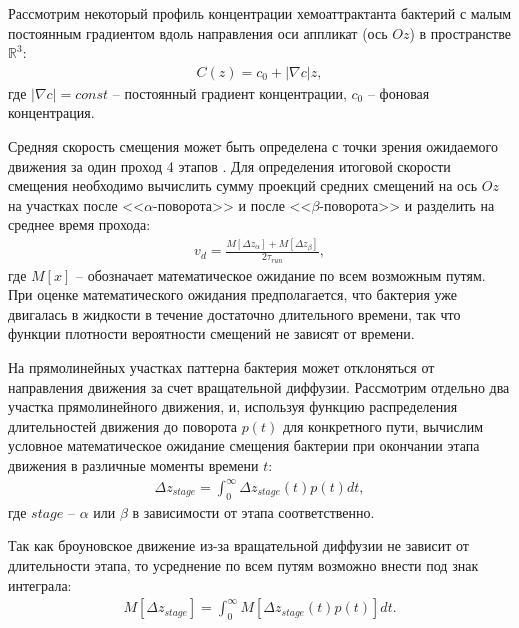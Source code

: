 Рассмотрим некоторый профиль концентрации хемоаттрактанта бактерий с малым постоянным градиентом вдоль направления оси аппликат (ось $Oz$) в пространстве $\mathbb{R}^3$:
\begin{equation}
    \begin{aligned}
        C(z) = c_0 + |\nabla c| z,
    \label{eq:linear-concentration}
    \end{aligned}
\end{equation}
где $|\nabla c|=const$ -- постоянный градиент концентрации, $c_0$ -- фоновая концентрация.

Средняя скорость смещения может быть определена с точки зрения ожидаемого движения за один проход 4 этапов \cite{locsei_persistence_2007}. Для определения итоговой скорости смещения необходимо вычислить сумму проекций средних смещений на ось $Oz$ на участках после <<$\alpha$-поворота>> и после <<$\beta$-поворота>> и разделить на среднее время прохода:
\begin{equation}
    \begin{aligned}
        v_d=\frac{M\left [\Delta z_{\alpha} \right ] + M\left [\Delta z_{\beta} \right ]}{{2\tau_{run}}},
    \label{eq:drift-speed-alpha-beta}
    \end{aligned}
\end{equation}
где $M\left [x \right ]$ -- обозначает математическое ожидание по всем возможным путям. При оценке математического ожидания предполагается, что бактерия уже двигалась в жидкости в течение достаточно длительного времени, так что функции плотности вероятности смещений не зависят от времени. 

На прямолинейных участках паттерна бактерия может отклоняться от направления движения за счет вращательной диффузии. Рассмотрим отдельно два участка прямолинейного движения, и, используя функцию распределения длительностей движения до поворота $p(t)$ для конкретного пути, вычислим условное математическое ожидание смещения бактерии при окончании этапа движения в различные моменты времени $t$:
\begin{equation}
    \begin{aligned}
        \Delta z_{stage}=\int_0^{\infty} \Delta z_{stage}(t)p(t)dt,
    \label{eq:displacement-integral-time}
    \end{aligned}
\end{equation}
где $stage$ -- $\alpha$ или $\beta$ в зависимости от этапа соответственно.

Так как броуновское движение из-за вращательной диффузии не зависит от длительности этапа, то усреднение по всем путям возможно внести под знак интеграла:
\begin{equation}
    \begin{aligned}
        M\left [\Delta z_{stage} \right ]=\int_0^{\infty} M\left [\Delta z_{stage}(t)p(t) \right ]dt.
    \label{eq:mean-displacement-integral-time}
    \end{aligned}
\end{equation}

